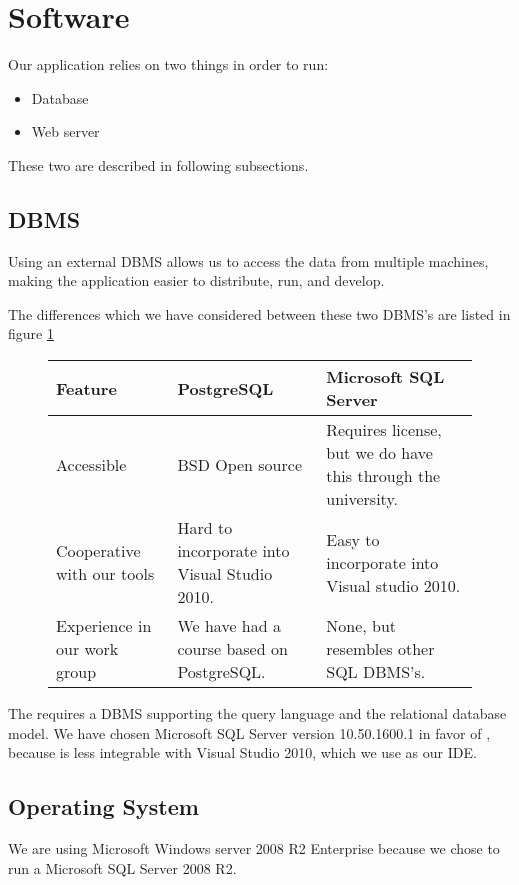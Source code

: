 \section{Software}
\label{sec:software}

Our application relies on two things in order to run:

\begin{itemize}
	\item Database
	\item Web server
\end{itemize}

These two are described in following subsections.

\subsection{DBMS}
\label{subsec:dbms}

Using an external DBMS allows us to access the data from multiple machines, making the application easier to distribute, run, and develop.

The differences which we have considered between these two DBMS's are listed in figure \ref{fig:DBMS}\cite{postgres08}

\begin{figure}[p]
	\centering
		\begin{tabularx}{\textwidth}{L|L|L}
			\textbf{Feature}&\textbf{PostgreSQL}&\textbf{Microsoft SQL Server} \\
			\hline
			Accessible&BSD Open source&Requires license, but we do have this through the university. \\ 
			Cooperative with our tools&Hard to incorporate into Visual Studio 2010. & Easy to incorporate into Visual studio 2010. \\ 
			Experience in our work group&We have had a course based on PostgreSQL. & None, but resembles other SQL DBMS's. \\ 
		\end{tabularx}
	\label{fig:DBMS}
\end{figure}

The \hdesk[] requires a DBMS supporting the query language \sql[] and the relational database model\cite{Sudershan2011}.
We have chosen Microsoft SQL Server version 10.50.1600.1 in favor of \posgresql[], because \posgresql[] is less integrable with Visual Studio 2010, which we use as our IDE.

\subsection{Operating System}
\label{subsec:operating_system}
We are using Microsoft Windows server 2008 R2 Enterprise because we chose to run a Microsoft SQL Server 2008 R2. 

